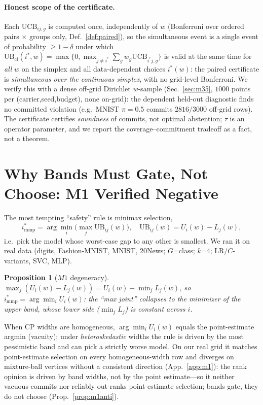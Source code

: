 \documentclass{article}
\newtheorem{proposition}{Proposition}
\begin{document}
\paragraph{Honest scope of the certificate.} Each $\mathrm{UCB}_{ij,g}$ is computed once,
independently of $w$ (Bonferroni over ordered pairs $\times$ groups only, Def.~\ref{def:paired}),
so the simultaneous event is a single event of probability $\ge1-\delta$ under which
$\mathrm{UB}_{\mathrm{cf}}(i^*,w)=\max\{0,\max_{j\ne i^*}\sum_g w_g\mathrm{UCB}_{i^*j,g}\}$ is valid at the same
time for \emph{all} $w$ on the simplex and all data-dependent choices $i^*(w)$: the paired
certificate is \emph{simultaneous over the continuous simplex}, with no grid-level Bonferroni.
We verify this with a dense off-grid Dirichlet $w$-sample
(Sec.~\ref{sec:m35}, $1000$ points per (carrier,seed,budget), none on-grid): the dependent
held-out diagnostic finds no committed violation (e.g.\ MNIST $\pi{=}0.5$ commits $2816/3000$ off-grid rows). The
certificate certifies \emph{soundness} of commits, not optimal abstention; $\tau$ is an
operator parameter, and we report the coverage--commitment tradeoff as a fact, not a theorem.

\section{Why Bands Must Gate, Not Choose: M1 Verified Negative}
\label{sec:m1}

The most tempting ``safety'' rule is minimax selection,
\[
  i^*_{\mathrm{mmp}}=\arg\min_i \Big(\max_j \mathrm{UB}_{ij}(w)\Big),\quad
  \mathrm{UB}_{ij}(w)=U_i(w)-L_j(w),
\]
i.e.\ pick the model whose worst-case gap to any other is smallest. We ran it on real data
(digits, Fashion-MNIST, MNIST, 20News; $G$=class; $k$=4; LR/$C$-variants, SVC, MLP).

\begin{proposition}[$M1$ degeneracy]
\label{prop:m1}
$\max_j (U_i(w)-L_j(w)) = U_i(w)-\min_j L_j(w)$, so
$i^*_{\mathrm{mmp}}=\arg\min_i U_i(w)$: the ``max joint'' collapses to the minimizer of the
upper band, whose lower side ($\min_j L_j$) is constant across $i$.
\end{proposition}

When CP widths are homogeneous, $\arg\min_i U_i(w)$ equals the point-estimate argmin
(vacuity); under \emph{heteroskedastic} widths the rule is driven by the most pessimistic
band and can pick a strictly worse model. On our real grid it matches point-estimate
selection on every homogeneous-width row and diverges on mixture-ball vertices without a
consistent direction (App.~\ref{app:m1}): the rank opinion is driven by band widths, not by
the point estimate---so it neither vacuous-commits nor reliably out-ranks point-estimate
selection; bands gate, they do not choose (Prop.~\ref{prop:m1anti}).
\end{document}
